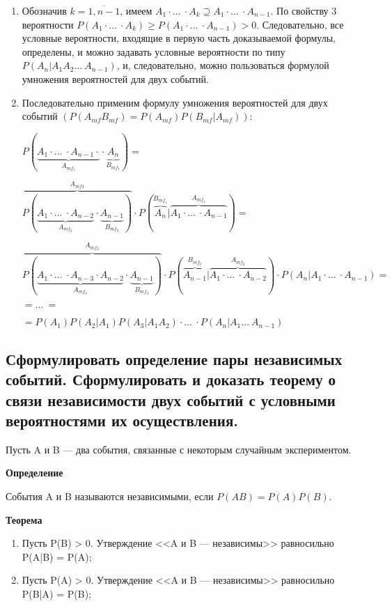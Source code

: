 \begin{enumerate}
	\item Обозначив $k=\overline{1,n-1}$, имеем $A_1 \cdot \dots\ \cdot A_k \supseteq A_1 \cdot \dots\ \cdot A_{n-1}$. 
	По свойству 3 вероятности $P(A_1 \cdot \dots\ \cdot A_k) \geqslant P(A_1 \cdot \dots\ \cdot A_{n-1}) > 0$.
	Следовательно, все условные вероятности, входящие в первую часть доказываемой формулы, определены, и можно задавать условные вероятности по типу $P(A_n | A_1A_2 \dots\ A_{n-1})$, и, следовательно, можно пользоваться формулой умножения вероятностей для двух событий.
	
	\item Последовательно применим формулу умножения вероятностей для двух событий $(P(A_{mf}B_{mf}) = P(A_{mf})P(B_{mf}|A_{mf})):$
	
	$P(\underbrace{A_1 \cdot \dots\ \cdot A_{n-1} \cdot}_{A_{mf_1}} \cdot \underbrace{A_n}_{B_{mf_1}}) = $
	
	$\overbrace{P(\underbrace{A_1 \cdot \dots\ \cdot A_{n-2} }_{A_{mf_2}} \cdot \underbrace{A_{n-1}}_{B_{mf_2}})}^{A_{mf1}} \cdot P(\overbrace{A_n}^{B_{mf_1}} | \overbrace{A_1 \cdot \dots\ \cdot A_{n-1}}^{A_{mf_1}}) = $
	
	$\overbrace{P(\underbrace{A_1 \cdot \dots\ \cdot A_{n-3} \cdot A_{n-2} }_{A_{mf_3}} \cdot \underbrace{A_{n-1}}_{B_{mf_3}})}^{A_{mf_2}} 
	\cdot P(\overbrace{A_{n-1}}^{B_{mf_2}} | \overbrace{A_1 \cdot \dots\ \cdot A_{n-2}}^{A_{mf_2}}) \cdot P(A_n | A_1 \cdot \dots\ \cdot A_{n-1}) = $
	
	$= \dots\ =$
	
	$ = P(A_1)P(A_2|A_1)P(A_3|A_1A_2) \cdot \dots\ \cdot P(A_n|A_1 \dots\ A_{n-1})$
\end{enumerate}

\subsection{Сформулировать определение пары независимых событий. Сформулировать и доказать теорему о связи независимости двух событий с условными вероятностями их осуществления.}

Пусть A и B --- два события, связанные с некоторым случайным экспериментом.

\textbf{Определение}

События A и B называются независимыми, если $P(AB) = P(A) P(B)$.

\textbf{Теорема}

\begin{enumerate}
	\item Пусть P(B) > 0. Утверждение <<A и B --- независимы>> равносильно P(A|B) = P(A);
	\item Пусть P(A) > 0. Утверждение <<A и B --- независимы>> равносильно P(B|A) = P(B);
\end{enumerate}

